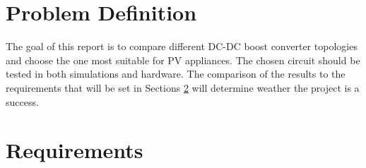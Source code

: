 \section{Problem Definition}\label{sec:probdesc}
The goal of this report is to compare different DC-DC boost converter topologies and choose the one most suitable for PV appliances. The chosen circuit should be tested in both simulations and hardware. The comparison of the results to the requirements that will be set in Sections \ref{sec:req} will determine weather the project is a success. 



\section{Requirements}\label{sec:req}

